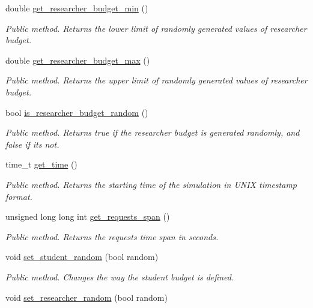 \begin{DoxyCompactItemize}
double \hyperlink{classConfiguration_aefb667cc98649f5a32fc16665c6b28c9}{get\+\_\+researcher\+\_\+budget\+\_\+min} ()
\begin{DoxyCompactList}\small\item\em Public method. Returns the lower limit of randomly generated values of researcher budget. \end{DoxyCompactList}\item 
double \hyperlink{classConfiguration_ac4ae307e11f10c5cf1a0e32d14621948}{get\+\_\+researcher\+\_\+budget\+\_\+max} ()
\begin{DoxyCompactList}\small\item\em Public method. Returns the upper limit of randomly generated values of researcher budget. \end{DoxyCompactList}\item 
bool \hyperlink{classConfiguration_aaf2bcbe58e2a4844c2f6d74a94191ac5}{is\+\_\+researcher\+\_\+budget\+\_\+random} ()
\begin{DoxyCompactList}\small\item\em Public method. Returns true if the researcher budget is generated randomly, and false if it\textquotesingle{}s not. \end{DoxyCompactList}\item 
time\+\_\+t \hyperlink{classConfiguration_aeb49a69a8a52a9603d5e46180a73b770}{get\+\_\+time} ()
\begin{DoxyCompactList}\small\item\em Public method. Returns the starting time of the simulation in U\+N\+IX timestamp format. \end{DoxyCompactList}\item 
unsigned long long int \hyperlink{classConfiguration_a4f94d71b89f3fdea573050da6fe5e0e6}{get\+\_\+requests\+\_\+span} ()
\begin{DoxyCompactList}\small\item\em Public method. Returns the requests time span in seconds. \end{DoxyCompactList}\item 
void \hyperlink{classConfiguration_a057a8d808d077731c582ec280a897bf9}{set\+\_\+student\+\_\+random} (bool random)
\begin{DoxyCompactList}\small\item\em Public method. Changes the way the student budget is defined. \end{DoxyCompactList}\item 
void \hyperlink{classConfiguration_a6230496122b25f645092fe3b9896f883}{set\+\_\+researcher\+\_\+random} (bool random)

\end{DoxyCompactItemize}
